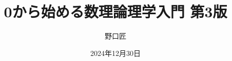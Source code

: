 \documentclass[10pt, a5j, ]{ltjsbook} %
\numberwithin{equation}{section}
\theoremstyle{logicchip}
\theoremstyle{logicque}
\theoremstyle{logicchip}
\renewcommand{\presectionname}{\S}
\newcommand{\presubsectionname}{\S\S}
\begin{document}
\begin{titlepage}
	\title{0から始める数理論理学入門 第3版}
	\author{野口匠}
	\date{2024年12月30日}
	\maketitle
\end{titlepage}

\frontmatter



\tableofcontents

\mainmatter









\backmatter

\RenewDocumentCommand{\presectionname}{}{}
\RenewDocumentCommand{\presubsectionname}{}{}


\nocite{*}
\printbibliography[title=参考文献, heading=bibintoc]

\printindex[sidx]
\printindex[widx]

\newpage
\pagestyle{empty}
~
\newpage
~
\newpage


\end{document}
